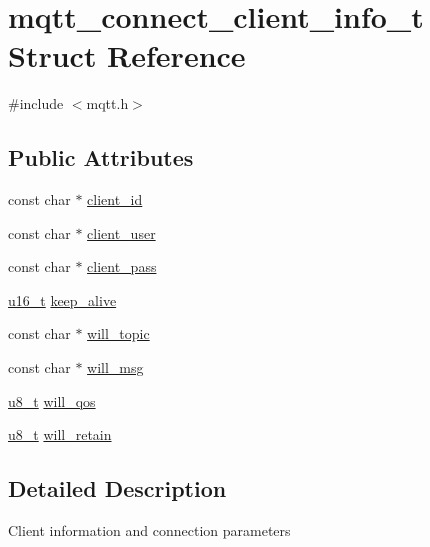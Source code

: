 \hypertarget{structmqtt__connect__client__info__t}{}\section{mqtt\+\_\+connect\+\_\+client\+\_\+info\+\_\+t Struct Reference}
\label{structmqtt__connect__client__info__t}


{\ttfamily \#include $<$mqtt.\+h$>$}

\subsection*{Public Attributes}
\begin{DoxyCompactItemize}
\item 
const char $\ast$ \hyperlink{structmqtt__connect__client__info__t_a6144f835d04295d5b3f8b1ca8045fdc7}{client\+\_\+id}
\item 
const char $\ast$ \hyperlink{structmqtt__connect__client__info__t_ab596ae8452515fea0fc1f357a48ef817}{client\+\_\+user}
\item 
const char $\ast$ \hyperlink{structmqtt__connect__client__info__t_a83a2bc816eda26f4b4c3e62cb6250e41}{client\+\_\+pass}
\item 
\hyperlink{group__compiler__abstraction_ga77570ac4fcab86864fa1916e55676da2}{u16\+\_\+t} \hyperlink{structmqtt__connect__client__info__t_ac80262a7456812e9eefffd8c3b9ac21a}{keep\+\_\+alive}
\item 
const char $\ast$ \hyperlink{structmqtt__connect__client__info__t_a1d79a9dd71c372543f0e0a68ebe2ca31}{will\+\_\+topic}
\item 
const char $\ast$ \hyperlink{structmqtt__connect__client__info__t_aac915378a41fa78906300285d88137f2}{will\+\_\+msg}
\item 
\hyperlink{group__compiler__abstraction_ga4caecabca98b43919dd11be1c0d4cd8e}{u8\+\_\+t} \hyperlink{structmqtt__connect__client__info__t_a07954934f4fecf54fa190997848229d9}{will\+\_\+qos}
\item 
\hyperlink{group__compiler__abstraction_ga4caecabca98b43919dd11be1c0d4cd8e}{u8\+\_\+t} \hyperlink{structmqtt__connect__client__info__t_a49c10873f44d7534140a63eef2a6a4e3}{will\+\_\+retain}
\end{DoxyCompactItemize}


\subsection{Detailed Description}
Client information and connection parameters 

